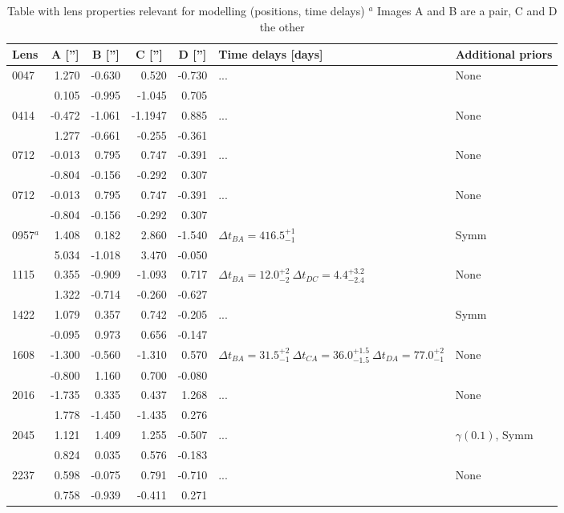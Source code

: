 \documentclass[useAMS,usenatbib]{mn2e}
\begin{document}
\begin{table}
  \begin{center}
    \begin{tabular}{l r r r r l l}
      Lens    & \multicolumn{1}{c}{A ['']} & \multicolumn{1}{c}{B ['']} & \multicolumn{1}{c}{C ['']} & \multicolumn{1}{c}{D ['']} & Time delays [days] & Additional priors \\ \hline
      0047 & 1.270 & -0.630 & 0.520 & -0.730 & ... & None \\
           & 0.105 & -0.995 & -1.045 & 0.705 & &  \\
      0414 & -0.472 & -1.061 & -1.1947 & 0.885 & ... & None \\
           & 1.277 & -0.661 & -0.255 & -0.361 & &  \\
      0712 & -0.013 & 0.795 & 0.747 & -0.391 & ... & None \\
           & -0.804 & -0.156 & -0.292 & 0.307 & &  \\
      0712 & -0.013 & 0.795 & 0.747 & -0.391 & ... & None \\
           & -0.804 & -0.156 & -0.292 & 0.307 &  &  \\
      0957$^{a}$ & 1.408 & 0.182 & 2.860 & -1.540 & $\Delta t_{BA}=416.5^{+1}_{-1}$ & Symm \\
           & 5.034 & -1.018 & 3.470 & -0.050 &  &  \\
      1115 & 0.355 & -0.909 & -1.093 & 0.717 & $\Delta t_{BA}=12.0^{+2}_{-2} \ \Delta t_{DC}=4.4^{+3.2}_{-2.4}$ & None \\
           & 1.322 & -0.714 & -0.260 & -0.627 & &  \\
      1422 & 1.079 & 0.357 & 0.742 & -0.205 & ... & Symm \\
           & -0.095 & 0.973 & 0.656 & -0.147 &  &  \\
      1608 & -1.300 & -0.560 & -1.310 & 0.570 & $\Delta t_{BA}=31.5^{+2}_{-1} \ \Delta t_{CA}=36.0^{+1.5}_{-1.5} \ \Delta t_{DA}=77.0^{+2}_{-1}$ & None \\
           & -0.800 & 1.160 & 0.700 & -0.080 &  &  \\
      2016 & -1.735 & 0.335 & 0.437 & 1.268 & ... & None \\
           & 1.778 & -1.450 & -1.435 & 0.276 &  &  \\
      2045 & 1.121 & 1.409 & 1.255 & -0.507 & ... & $\gamma(0.1)$, Symm \\
           & 0.824 & 0.035 & 0.576 & -0.183 &  &  \\
      2237 & 0.598 & -0.075 & 0.791 & -0.710 & ... & None \\
              & 0.758 & -0.939 & -0.411 & 0.271 &  &  \\
    \end{tabular}
    \caption[width=\linewidth]{Table with lens properties relevant for modelling (positions, time delays) \newline $^{a}$ Images A and B are a pair, C and D the other }
    \label{tab:lensmodelling}
  \end{center}
\end{table}
\end{document}
